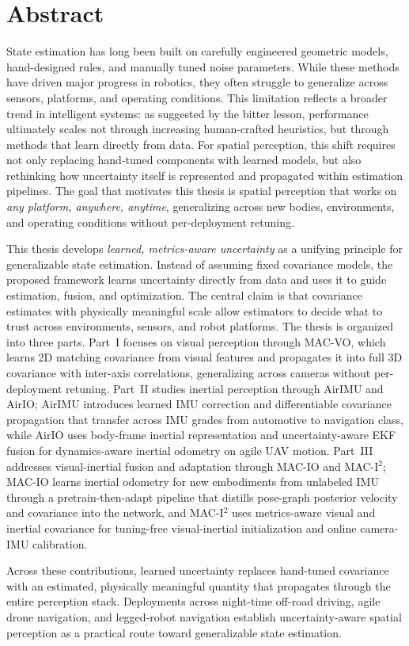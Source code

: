 \chapter*{Abstract}

State estimation has long been built on carefully engineered geometric models, hand-designed rules, and manually tuned noise parameters.
While these methods have driven major progress in robotics, they often struggle to generalize across sensors, platforms, and operating conditions.
This limitation reflects a broader trend in intelligent systems: as suggested by the bitter lesson, performance ultimately scales not through increasing human-crafted heuristics, but through methods that learn directly from data.
For spatial perception, this shift requires not only replacing hand-tuned components with learned models, but also rethinking how uncertainty itself is represented and propagated within estimation pipelines.
The goal that motivates this thesis is spatial perception that works on \textit{any platform, anywhere, anytime}, generalizing across new bodies, environments, and operating conditions without per-deployment retuning.

This thesis develops \textit{learned, metrics-aware uncertainty} as a unifying principle for generalizable state estimation.
Instead of assuming fixed covariance models, the proposed framework learns uncertainty directly from data and uses it to guide estimation, fusion, and optimization.
The central claim is that covariance estimates with physically meaningful scale allow estimators to decide what to trust across environments, sensors, and robot platforms.
The thesis is organized into three parts.
Part~I focuses on visual perception through MAC-VO, which learns 2D matching covariance from visual features and propagates it into full 3D covariance with inter-axis correlations, generalizing across cameras without per-deployment retuning.
Part~II studies inertial perception through AirIMU and AirIO; AirIMU introduces learned IMU correction and differentiable covariance propagation that transfer across IMU grades from automotive to navigation class, while AirIO uses body-frame inertial representation and uncertainty-aware EKF fusion for dynamics-aware inertial odometry on agile UAV motion.
Part~III addresses visual-inertial fusion and adaptation through MAC-IO and MAC-I$^2$; MAC-IO learns inertial odometry for new embodiments from unlabeled IMU through a pretrain-then-adapt pipeline that distills pose-graph posterior velocity and covariance into the network, and MAC-I$^2$ uses metrics-aware visual and inertial covariance for tuning-free visual-inertial initialization and online camera-IMU calibration.

Across these contributions, learned uncertainty replaces hand-tuned covariance with an estimated, physically meaningful quantity that propagates through the entire perception stack.
Deployments across night-time off-road driving, agile drone navigation, and legged-robot navigation establish uncertainty-aware spatial perception as a practical route toward generalizable state estimation.
